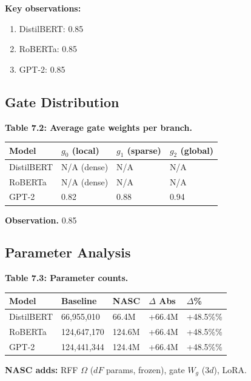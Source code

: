 \textbf{Key observations:}

\begin{enumerate}
\item DistilBERT: 0.85
\item RoBERTa: 0.85
\item GPT-2: 0.85

\end{enumerate}
\subsection{Gate Distribution}

\textbf{Table 7.2: Average gate weights per branch.}

\begin{table}[H]
\centering
\small
\begin{tabular}{llll}
\toprule
\textbf{Model} & \textbf{$g_0$ (local)} & \textbf{$g_1$ (sparse)} & \textbf{$g_2$ (global)} \\
\midrule
DistilBERT & N/A (dense) & N/A & N/A \\
RoBERTa & N/A (dense) & N/A & N/A \\
GPT-2 & 0.82 & 0.88 & 0.94 \\
\bottomrule
\end{tabular}
\end{table}

\textbf{Observation.} 0.85

\subsection{Parameter Analysis}

\textbf{Table 7.3: Parameter counts.}

\begin{table}[H]
\centering
\small
\begin{tabular}{lllll}
\toprule
\textbf{Model} & \textbf{Baseline} & \textbf{NASC} & \textbf{$\Delta$ Abs} & \textbf{$\Delta$\%} \\
\midrule
DistilBERT & 66,955,010 & 66.4M & +66.4M & +48.5\%\% \\
RoBERTa & 124,647,170 & 124.6M & +66.4M & +48.5\%\% \\
GPT-2 & 124,441,344 & 124.4M & +66.4M & +48.5\%\% \\
\bottomrule
\end{tabular}
\end{table}

\textbf{NASC adds:} RFF $\Omega$ ($dF$ params, frozen), gate $W_g$ ($3d$), LoRA.

